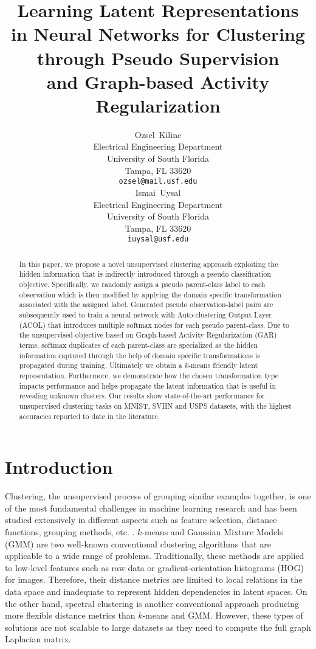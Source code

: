 \documentclass{article} \usepackage{iclr2018_conference,times}
\title{Learning Latent Representations \\in Neural Networks for Clustering \\through Pseudo Supervision \\and Graph-based Activity Regularization}
\author{
  Ozsel~Kilinc \\
  Electrical Engineering Department\\
  University of South Florida\\
  Tampa, FL 33620 \\
  \texttt{ozsel@mail.usf.edu} \\
\And
  Ismai~Uysal  \\
  Electrical Engineering Department \\
  University of South Florida \\
  Tampa, FL 33620  \\
  \texttt{iuysal@usf.edu} \\
}
\begin{document}
\maketitle

\begin{abstract}
	
In this paper, we propose a novel unsupervised clustering approach exploiting the hidden information that is indirectly introduced through a pseudo classification objective. Specifically, we randomly assign a pseudo parent-class label to each observation which is then modified by applying the domain specific transformation associated with the assigned label. Generated pseudo observation-label pairs are subsequently used to train a neural network with Auto-clustering Output Layer (ACOL) that introduces multiple softmax nodes for each pseudo parent-class. Due to the unsupervised objective based on Graph-based Activity Regularization (GAR) terms, softmax duplicates of each parent-class are specialized as the hidden information captured through the help of domain specific transformations is propagated during training. Ultimately we obtain a $k$-means friendly latent representation. Furthermore, we demonstrate how the chosen transformation type impacts performance and helps propagate the latent information that is useful in revealing unknown clusters. Our results show state-of-the-art performance for unsupervised clustering tasks on MNIST, SVHN and USPS datasets, with the highest accuracies reported to date in the literature.
\end{abstract}

\section{Introduction}

Clustering, the unsupervised process of grouping similar examples together, is one of the most fundamental challenges in machine learning research and has been studied extensively in different aspects such as feature selection, distance functions, grouping methods, etc. \citep{aggarwal2013}. $k$-means \citep{macqueen1967some} and Gaussian Mixture Models (GMM) \citep{Bishop07} are two well-known conventional clustering algorithms that are applicable to a wide range of problems. Traditionally, these methods are applied to low-level features such as raw data or gradient-orientation histograms (HOG) for images. Therefore, their distance metrics are limited to local relations in the data space and inadequate to represent hidden dependencies in latent spaces. On the other hand, spectral clustering \citep{Luxburg07} is another conventional approach producing more flexible distance metrics than $k$-means and GMM. However, these types of solutions are not scalable to large datasets as they need to compute the full graph Laplacian matrix.
\end{document}
